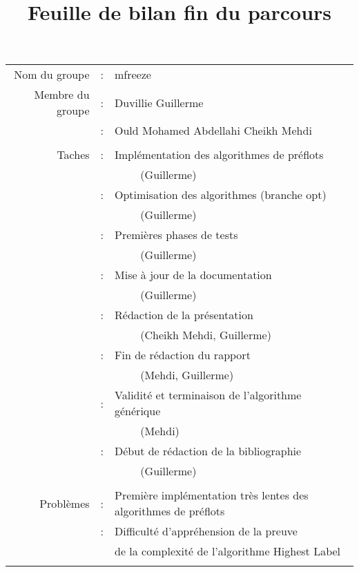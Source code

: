 

\title {Feuille de bilan fin du parcours}



\maketitle

\begin{tabular}{rcl}
	Nom du groupe     &:& mfreeze\\
	Membre du groupe  &:& Duvillie Guillerme \\
	                  &:& Ould Mohamed Abdellahi Cheikh Mehdi \\ 
	\\
	Taches    &:& Implémentation des algorithmes de préflots \\ && ~~~~ (Guillerme)\\
							 			&:&	Optimisation des algorithmes (branche opt) \\ && ~~~~ (Guillerme)\\
								 	 &:& Premières phases de tests \\ && ~~~~ (Guillerme) \\
	          &:& Mise à jour de la documentation \\ && ~~~~ (Guillerme) \\
	                  &:& Rédaction de la présentation  \\
														 && ~~~~ (Cheikh Mehdi, Guillerme)\\
	              &:& Fin de rédaction du rapport \\ && ~~~~ (Mehdi, Guillerme)\\
												 	 &:& Validité et terminaison de l'algorithme générique \\
													 	&& ~~~~ (Mehdi)\\
											 		 &:& Début de rédaction de la bibliographie \\ &&~~~~ (Guillerme) \\
	                  & &  \\
				 		Problèmes &:& Première implémentation très lentes des algorithmes de préflots \\
									 		&:& Difficulté d'appréhension de la preuve\\
						 			&& de la complexité de l'algorithme Highest Label \\
											&& \\
\end{tabular}




